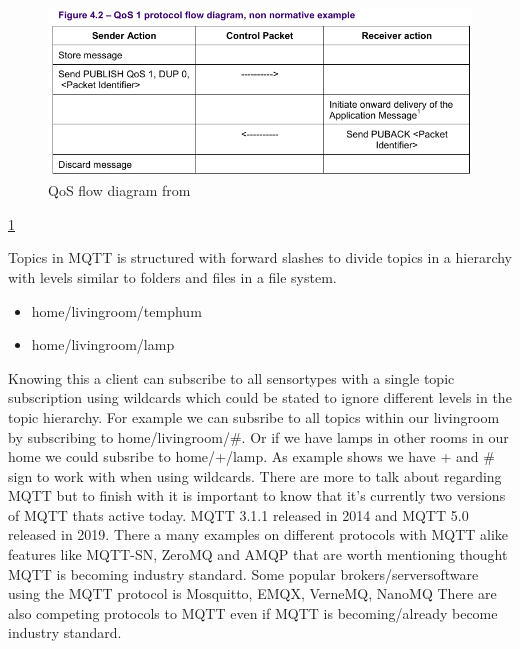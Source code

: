 \documentclass[article,a4paper]{IEEEtran}
\begin{document}
    \begin{figure}
        \includegraphics[width=\columnwidth]{QoS1.png} 
        \caption{QoS flow diagram from \cite{mqtt3.1.1}}
        \label{fig2:QoS1 flow diagram}   
    \end{figure}
    \ref{fig2:QoS1 flow diagram} 
    
    Topics in MQTT \cite{mqtt3.1.1} is structured with forward slashes to divide topics in a hierarchy with levels similar to folders and files in a file system.
    \begin{itemize}
        \item home/livingroom/temphum
        \item home/livingroom/lamp
    \end{itemize} 
    Knowing this a client can subscribe to all sensortypes with a single topic subscription using wildcards which could be stated to ignore different levels in the topic hierarchy. For example we can subsribe to all topics within our livingroom by subscribing to home/livingroom/\#. Or if we have lamps in other rooms in our home we could subsribe to home/+/lamp. As example shows we have + and \# sign to work with when using wildcards. There are more to talk about regarding MQTT but to finish with it is important to know that it's currently two versions of MQTT thats active today. MQTT 3.1.1 released in 2014 and MQTT 5.0 released in 2019. There a many examples on different protocols with MQTT alike features like MQTT-SN, ZeroMQ and AMQP that are worth mentioning thought MQTT is becoming industry standard. Some popular brokers/serversoftware using the MQTT protocol is Mosquitto, EMQX, VerneMQ, NanoMQ \cite{PopularMQTTprotocol}  There are also competing protocols to MQTT even if MQTT is becoming/already become industry standard.
\end{document}
